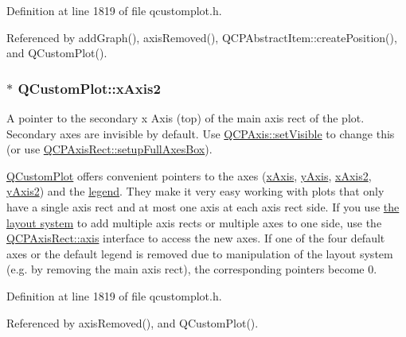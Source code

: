 Definition at line 1819 of file qcustomplot.\+h.



Referenced by add\+Graph(), axis\+Removed(), Q\+C\+P\+Abstract\+Item\+::create\+Position(), and Q\+Custom\+Plot().

\hypertarget{class_q_custom_plot_ada41599f22cad901c030f3dcbdd82fd9}{}
\subsubsection[{x\+Axis2}]{ $\ast$ Q\+Custom\+Plot\+::x\+Axis2}\label{class_q_custom_plot_ada41599f22cad901c030f3dcbdd82fd9}
A pointer to the secondary x Axis (top) of the main axis rect of the plot. Secondary axes are invisible by default. Use \hyperlink{class_q_c_p_layerable_a3bed99ddc396b48ce3ebfdc0418744f8}{Q\+C\+P\+Axis\+::set\+Visible} to change this (or use \hyperlink{class_q_c_p_axis_rect_a5fa906175447b14206954f77fc7f1ef4}{Q\+C\+P\+Axis\+Rect\+::setup\+Full\+Axes\+Box}).

\hyperlink{class_q_custom_plot}{Q\+Custom\+Plot} offers convenient pointers to the axes (\hyperlink{class_q_custom_plot_a9a79cd0158a4c7f30cbc702f0fd800e4}{x\+Axis}, \hyperlink{class_q_custom_plot_af6fea5679725b152c14facd920b19367}{y\+Axis}, \hyperlink{class_q_custom_plot_ada41599f22cad901c030f3dcbdd82fd9}{x\+Axis2}, \hyperlink{class_q_custom_plot_af13fdc5bce7d0fabd640f13ba805c0b7}{y\+Axis2}) and the \hyperlink{class_q_custom_plot_a4eadcd237dc6a09938b68b16877fa6af}{legend}. They make it very easy working with plots that only have a single axis rect and at most one axis at each axis rect side. If you use \hyperlink{}{the layout system} to add multiple axis rects or multiple axes to one side, use the \hyperlink{class_q_c_p_axis_rect_a560de44e47a4af0f86c59102a094b1e4}{Q\+C\+P\+Axis\+Rect\+::axis} interface to access the new axes. If one of the four default axes or the default legend is removed due to manipulation of the layout system (e.\+g. by removing the main axis rect), the corresponding pointers become 0. 

Definition at line 1819 of file qcustomplot.\+h.



Referenced by axis\+Removed(), and Q\+Custom\+Plot().

\hypertarget{class_q_custom_plot_af6fea5679725b152c14facd920b19367}{}

